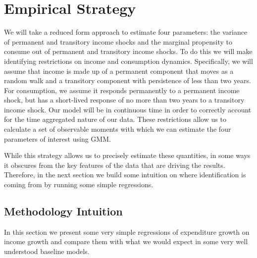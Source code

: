 \documentclass[titlepage]{\econtex}\newcommand{\texname}{ConsumptionHeterogeneity}
\begin{document}
\section{Empirical Strategy} \label{empirical_strategy} 
We will take a reduced form approach to estimate four parameters: the variance of permanent and transitory income shocks and the marginal propensity to consume out of permanent and transitory income shocks. To do this we will make identifying restrictions on income and consumption dynamics. Specifically, we will assume that income is made up of a permanent component that moves as a random walk and a transitory component with persistence of less than two years. For consumption, we assume it responds permanently to a permanent income shock, but has a short-lived response of no more than two years to a transitory income shock. Our model will be in continuous time in order to correctly account for the time aggregated nature of our data. These restrictions allow us to calculate a set of observable moments with which we can estimate the four parameters of interest using GMM.

 While this strategy allows us to precisely estimate these quantities, in some ways it obscures from the key features of the data that are driving the results. Therefore, in the next section we build some intuition on where identification is coming from by running some simple regressions.

\subsection{Methodology Intuition}
In this section we present some very simple regressions of expenditure growth on income growth and compare them with what we would expect in some very well understood baseline models.
\end{document}
